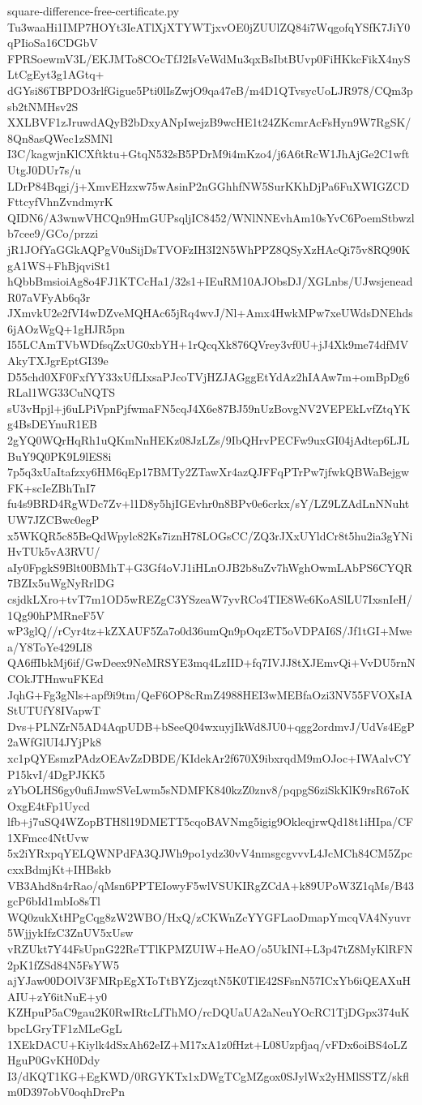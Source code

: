 \documentclass[11pt]{article}
\theoremstyle{definition}
\theoremstyle{remark}
\begin{document}
\begin{filecontents*}[overwrite]{square-difference-free-certificate.py}
Tu3waaHi1IMP7HOYt3IeATlXjXTYWTjxvOE0jZUUlZQ84i7WqgofqYSfK7JiY0qPIioSa16CDGbV
FPRSoewmV3L/EKJMTo8COcTfJ2IsVeWdMu3qxBsIbtBUvp0FiHKkcFikX4nySLtCgEyt3g1AGtq+
dGYsi86TBPDO3rlfGigue5Pti0lIsZwjO9qa47eB/m4D1QTvsycUoLJR978/CQm3psb2tNMHsv2S
XXLBVF1zJruwdAQyB2bDxyANpIwejzB9wcHE1t24ZKcmrAcFsHyn9W7RgSK/8Qn8asQWec1zSMNl
I3C/kagwjnKlCXftktu+GtqN532sB5PDrM9i4mKzo4/j6A6tRcW1JhAjGe2C1wftUtgJ0DUr7s/u
LDrP84Bqgi/j+XmvEHzxw75wAsinP2nGGhhfNW5SurKKhDjPa6FuXWIGZCDFttcyfVhnZvndmyrK
QIDN6/A3wnwVHCQn9HmGUPsqljIC8452/WNlNNEvhAm10sYvC6PoemStbwzlb7cee9/GCo/przzi
jR1JOfYaGGkAQPgV0uSijDsTVOFzIH3I2N5WhPPZ8QSyXzHAcQi75v8RQ90KgA1WS+FhBjqviSt1
hQbbBmsioiAg8o4FJ1KTCcHa1/32s1+IEuRM10AJObsDJ/XGLnbs/UJwsjeneadR07aVFyAb6q3r
JXmvkU2e2fVI4wDZveMQHAc65jRq4wvJ/Nl+Amx4HwkMPw7xeUWdsDNEhds6jAOzWgQ+1gHJR5pn
I55LCAmTVbWDfsqZxUG0xbYH+1rQcqXk876QVrey3vf0U+jJ4Xk9me74dfMVAkyTXJgrEptGI39e
D55chd0XF0FxfYY33xUfLIxsaPJcoTVjHZJAGggEtYdAz2hIAAw7m+omBpDg6RLal1WG33CuNQTS
sU3vHpjl+j6uLPiVpnPjfwmaFN5cqJ4X6e87BJ59nUzBovgNV2VEPEkLvfZtqYKg4BsDEYnuR1EB
2gYQ0WQrHqRh1uQKmNnHEKz08JzLZs/9IbQHrvPECFw9uxGI04jAdtep6LJLBuY9Q0PK9L9lES8i
7p5q3xUaItafzxy6HM6qEp17BMTy2ZTawXr4azQJFFqPTrPw7jfwkQBWaBejgwFK+scIeZBhTnI7
fu4s9BRD4RgWDc7Zv+l1D8y5hjIGEvhr0n8BPv0e6crkx/sY/LZ9LZAdLnNNuhtUW7JZCBwc0egP
x5WKQR5c85BeQdWpylc82Ks7iznH78LOGsCC/ZQ3rJXxUYldCr8t5hu2ia3gYNiHvTUk5vA3RVU/
aIy0FpgkS9Blt00BMhT+G3Gf4oVJ1iHLnOJB2b8uZv7hWghOwmLAbPS6CYQR7BZIx5uWgNyRrlDG
csjdkLXro+tvT7m1OD5wREZgC3YSzeaW7yvRCo4TIE8We6KoASlLU7IxsnIeH/1Qg90hPMRneF5V
wP3glQ//rCyr4tz+kZXAUF5Za7o0d36umQn9pOqzET5oVDPAI6S/Jf1tGI+Mwea/Y8ToYe429LI8
QA6ffIbkMj6if/GwDeex9NeMRSYE3mq4LzIID+fq7IVJJ8tXJEmvQi+VvDU5rnNCOkJTHnwuFKEd
JqhG+Fg3gNls+apf9i9tm/QeF6OP8cRmZ4988HEI3wMEBfaOzi3NV55FVOXsIAStUTUfY8IVapwT
Dvs+PLNZrN5AD4AqpUDB+bSeeQ04wxuyjIkWd8JU0+qgg2ordmvJ/UdVs4EgP2aWfGlUI4JYjPk8
xc1pQYEsmzPAdzOEAvZzDBDE/KIdekAr2f670X9ibxrqdM9mOJoc+IWAalvCYP15kvI/4DgPJKK5
zYbOLHS6gy0ufiJmwSVeLwm5sNDMFK840kzZ0znv8/pqpgS6ziSkKlK9rsR67oKOxgE4tFp1Uycd
lfb+j7uSQ4WZopBTH8l19DMETT5cqoBAVNmg5igig9OkleqjrwQd18t1iHIpa/CF1XFmcc4NtUvw
5x2iYRxpqYELQWNPdFA3QJWh9po1ydz30vV4nmsgcgvvvL4JcMCh84CM5ZpccxxBdmjKt+IHBskb
VB3Ahd8n4rRao/qMsn6PPTEIowyF5wlVSUKIRgZCdA+k89UPoW3Z1qMs/B43gcP6bId1mbIo8sTl
WQ0zukXtHPgCqg8zW2WBO/HxQ/zCKWnZcYYGFLaoDmapYmcqVA4Nyuvr5WjjykIfzC3ZnUV5xUsw
vRZUkt7Y44FsUpnG22ReTTlKPMZUIW+HeAO/o5UkINI+L3p47tZ8MyKlRFN2pK1fZSd84N5FsYW5
ajYJaw00DOlV3FMRpEgXToTtBYZjczqtN5K0TlE42SFsnN57ICxYb6iQEAXuHAIU+zY6itNuE+y0
KZHpuP5aC9gau2K0RwIRtcLfThMO/rcDQUaUA2aNeuYOcRC1TjDGpx374uKbpcLGryTF1zMLeGgL
1XEkDACU+Kiylk4dSxAh62eIZ+M17xA1z0fHzt+L08Uzpfjaq/vFDx6oiBS4oLZHguP0GvKH0Ddy
I3/dKQT1KG+EgKWD/0RGYKTx1xDWgTCgMZgox0SJylWx2yHMlSSTZ/skflm0D397obV0oqhDrcPn

\end{filecontents*}
\end{document}
